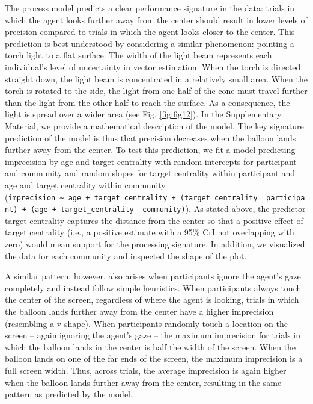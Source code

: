 \documentclass[
  man,floatsintext]{apa7}
\begin{document}
The process model predicts a clear performance signature in the data: trials in which the agent looks further away from the center should result in lower levels of precision compared to trials in which the agent looks closer to the center. This prediction is best understood by considering a similar phenomenon: pointing a torch light to a flat surface. The width of the light beam represents each individual's level of uncertainty in vector estimation. When the torch is directed straight down, the light beam is concentrated in a relatively small area. When the torch is rotated to the side, the light from one half of the cone must travel further than the light from the other half to reach the surface. As a consequence, the light is spread over a wider area (see Fig. \ref{fig:fig12}). In the Supplementary Material, we provide a mathematical description of the model.
The key signature prediction of the model is thus that precision decreases when the balloon lands further away from the center. To test this prediction, we fit a model predicting imprecision by age and target centrality with random intercepts for participant and community and random slopes for target centrality within participant and age and target centrality within community (\texttt{imprecision\ \textasciitilde{}\ age\ +\ target\_centrality\ +\ (target\_centrality\ \textbar{}\ participant)\ +\ (age\ +\ target\_centrality\ \textbar{}\ community)}). As stated above, the predictor target centrality captures the distance from the center so that a positive effect of target centrality (i.e., a positive estimate with a 95\% CrI not overlapping with zero) would mean support for the processing signature. In addition, we visualized the data for each community and inspected the shape of the plot.

A similar pattern, however, also arises when participants ignore the agent's gaze completely and instead follow simple heuristics. When participants always touch the center of the screen, regardless of where the agent is looking, trials in which the balloon lands further away from the center have a higher imprecision (resembling a v-shape). When participants randomly touch a location on the screen -- again ignoring the agent's gaze -- the maximum imprecision for trials in which the balloon lands in the center is half the width of the screen. When the balloon lands on one of the far ends of the screen, the maximum imprecision is a full screen width. Thus, across trials, the average imprecision is again higher when the balloon lands further away from the center, resulting in the same pattern as predicted by the model.
\end{document}
